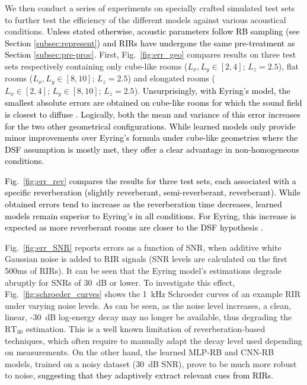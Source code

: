 \documentclass[reprint]{JASA}
\makeatletter
\newif\ifnotes
\newcommand{\note}[1]{\@bsphack\ifnotes{#1}\fi\@esphack}
\makeatother
\begin{document}
We then conduct a series of experiments on specially crafted simulated test sets to further test the efficiency of the different models against various acoustical conditions. \textcolor{black}{Unless stated otherwise, acoustic parameters follow RB sampling (see Section \ref{subsec:represent}) and RIRs have undergone the same pre-treatment as Section \ref{subsec:pre-proc}.}  
First, Fig.~\ref{fig:err_geo} compares results on three test sets respectively containing only cube-like rooms ($L_x, L_y \in [2,4];\,L_z=2.5$), flat rooms ($L_x, L_y \in[8,10];\,L_z=2.5$) and elongated rooms ($L_x \in[2,4];\,L_y \in[8,10];\,L_z=2.5$).
%
\note{\sout{While learned models only provide minor improvements over Eyring's under cube-like geometries where the diffuse sound-field assumption is mostly met, they offer a clear advantage in non-homogeneous conditions.}}
%
\textcolor{black}{Unsurprisingly, with Eyring's model, the smallest absolute errors are obtained on cube-like rooms for which the sound field is closest to diffuse \cite{Hodgson94,Hodgson96}. Logically, both the mean and variance of this error increases for the two other geometrical configurations. While learned models only provide minor improvements over Eyring's formula under cube-like geometries where the DSF assumption is mostly met, they offer a clear advantage in non-homogeneous conditions.}

\note{\sout{Next, Fig.~\ref{fig:err_rev} shows estimation errors on three subsets of a RB-sampled dataset, containing RIRs with constrained reverberation times across all octave bands. It shows that errors decrease when the reverberation time increases. This is expected, as more signal is then available to estimate energy decays. Nevertheless, learned models remain superior to Eyring's under all reverberation conditions.}} 

\textcolor{black}{Fig.~\ref{fig:err_rev} compares the results for three test sets, each associated with a specific reverberation (slightly reverberant, semi-reverberant, reverberant). While obtained errors tend to increase as the reverberation time decreases, learned models remain superior to Eyring's in all conditions. For Eyring, this increase is expected as more reverberant rooms are closer to the DSF hypothesis \cite{Hodgson94,Hodgson96}.}

Fig.~\ref{fig:err_SNR} reports errors as a function of SNR, when additive white Gaussian noise is added to RIR signals (SNR levels are calculated on the first 500ms of RIRs). It can be seen that the Eyring model's estimations degrade abruptly for SNRs of 30~dB or lower. To investigate this effect, Fig.~\ref{fig:schroeder_curves} shows the 1~kHz Schroeder curves of an example RIR under varying noise levels. As can be seen, as the noise level increases, a clean, linear, -30~dB log-energy decay may no longer be available, thus degrading the $\textrm{RT}_{30}$ estimation. This is a well known limitation of reverberation-based techniques, which often require to manually adapt the decay level used depending on measurements. On the other hand, the learned MLP-RB and CNN-RB models, trained on a noisy dataset (30~dB SNR), prove to be much more robust to noise, \textcolor{black}{suggesting that they adaptively extract relevant cues from RIRs}.
\end{document}
